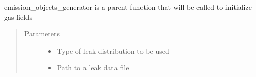 \documentclass[letterpaper,10pt,english]{sphinxmanual}
\begin{document}
\begin{fulllineitems}
\label{\detokenize{index:feast.EmissionSimModules.emission_class_functions.emission_objects_generator}}
emission\_objects\_generator is a parent function that will be called to initialize gas fields
\begin{quote}\begin{description}
\item[{Parameters}] \leavevmode\begin{itemize}
\item {} 
 \textendash{} Type of leak distribution to be used

\item {} 
 \textendash{} Path to a leak data file

\end{itemize}

\end{description}\end{quote}

\end{fulllineitems}

\end{document}

